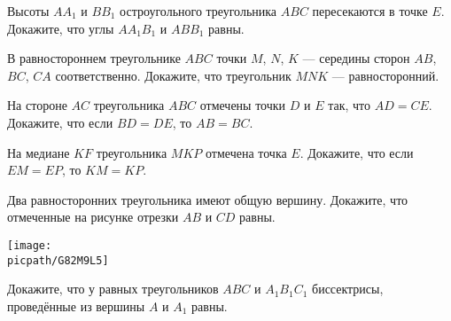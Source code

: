 \begin{class}[number=5]
	\begin{listofex}
		\item Высоты \( AA_1 \) и \( BB_1 \) остроугольного треугольника \( ABC \) пересекаются в точке \( E \). Докажите, что	углы \( AA_1B_1 \) и \( ABB_1 \) равны.
		\item В равностороннем треугольнике \( ABC \) точки \( M \), \( N \), \( K \) --- середины сторон \( AB \), \( BC \), \( CA \) соответственно. Докажите, что треугольник \( MNK \) --- равносторонний.
		\item На стороне \( AC \) треугольника \( ABC \) отмечены точки \( D \) и \( E \) так, что \( AD=CE \). Докажите, что если \( BD=DE \), то \( AB=BC \).
		\item На медиане \( KF \) треугольника \( MKP \) отмечена точка \( E \). Докажите, что если \( EM=EP \), то \( KM=KP \).
		\item 
		\begin{minipage}[t]{\bodywidth}
			Два равносторонних треугольника имеют общую	вершину. Докажите, что отмеченные на рисунке отрезки \( AB \) и \( CD \) равны.
		\end{minipage}
		\gapwidth
		\begin{minipage}[t]{\picwidth}
			\texttt{[image: \\picpath/G82M9L5]}
		\end{minipage}
		\item Докажите, что у равных треугольников \( ABC \) и \( A_1B_1C_1 \) биссектрисы, проведённые из вершины \( A \) и \( A_1 \) равны.
	\end{listofex}
\end{class}

